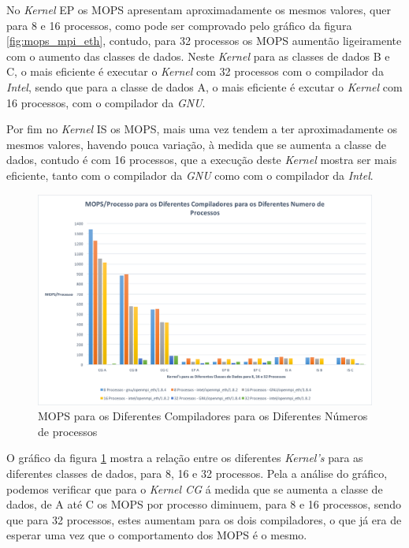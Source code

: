 \documentclass[conference,compsoc]{IEEEtran}
\begin{document}
No \textit{Kernel} EP os MOPS apresentam aproximadamente os mesmos valores, quer para 8 e 16 processos, como pode ser comprovado pelo gráfico da figura \ref{fig:mops_mpi_eth}, contudo, para 32 processos os MOPS aumentão ligeiramente com o aumento das classes de dados. Neste \textit{Kernel} para as classes de dados B e C, o mais eficiente é executar o \textit{Kernel} com 32 processos com o compilador da \textit{Intel}, sendo que para a classe de dados A, o mais eficiente é excutar o \textit{Kernel} com 16 processos, com o compilador da \textit{GNU}.

Por fim no \textit{Kernel} IS os MOPS, mais uma vez tendem a ter aproximadamente os mesmos valores, havendo pouca variação, à medida que se aumenta a classe de dados, contudo é com 16 processos, que a execução deste \textit{Kernel} mostra ser mais eficiente, tanto com o compilador da \textit{GNU} como com o compilador da \textit{Intel}.

\begin{figure}[h!]
\centering
\includegraphics[scale=0.325]{MPI/mops-process_dif_compiladores_dif_num_proc.png}
\caption{MOPS para os Diferentes Compiladores para os Diferentes Números de processos}
\label{fig:mops-process_mpi_eth}
\end{figure}

O gráfico da figura \ref{fig:mops-process_mpi_eth} mostra a relação entre os diferentes \textit{Kernel's} para as diferentes classes de dados, para 8, 16 e 32 processos. Pela a análise do gráfico, podemos verificar que para o \textit{Kernel CG} á medida que se aumenta a classe de dados, de A até C os MOPS por processo diminuem, para 8 e 16 processos, sendo que para 32 processos, estes aumentam para os dois compiladores, o que já era de esperar uma vez que o comportamento dos MOPS é o mesmo.
\end{document}
